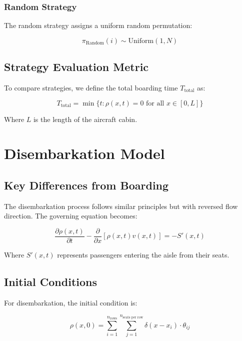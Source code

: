 \documentclass[a4paper,12pt]{article}
\begin{document}
\subsubsection{Random Strategy}

The random strategy assigns a uniform random permutation:

\begin{equation}
\pi_{\text{Random}}(i) \sim \text{Uniform}(1, N)
\end{equation}

\subsection{Strategy Evaluation Metric}

To compare strategies, we define the total boarding time $T_{\text{total}}$ as:

\begin{equation}
T_{\text{total}} = \min\{t : \rho(x,t) = 0 \text{ for all } x \in [0, L]\}
\end{equation}

Where $L$ is the length of the aircraft cabin.

\section{Disembarkation Model}
\subsection{Key Differences from Boarding}

The disembarkation process follows similar principles but with reversed flow direction. The governing equation becomes:

\begin{equation}
\frac{\partial \rho(x,t)}{\partial t} - \frac{\partial}{\partial x}[\rho(x,t)v(x,t)] = -S'(x,t)
\end{equation}

Where $S'(x,t)$ represents passengers entering the aisle from their seats.

\subsection{Initial Conditions}

For disembarkation, the initial condition is:

\begin{equation}
\rho(x,0) = \sum_{i=1}^{n_{\text{rows}}} \sum_{j=1}^{n_{\text{seats per row}}} \delta(x - x_i) \cdot \theta_{ij}
\end{equation}
\end{document}
